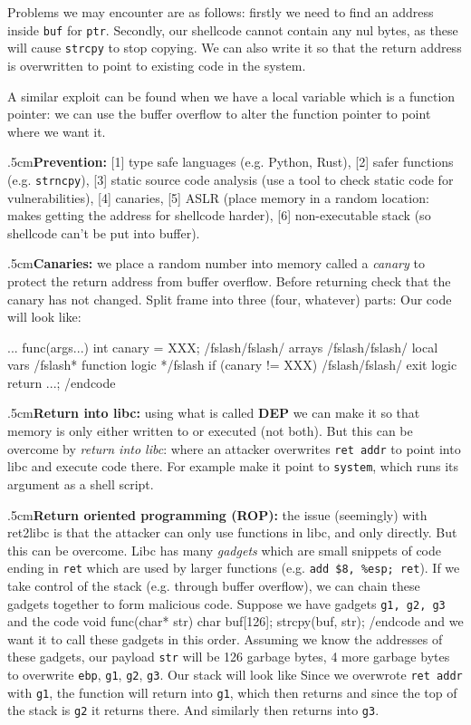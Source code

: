 Problems we may encounter are as follows: firstly we need to find an address inside {\tt buf} for {\tt ptr}.
Secondly, our shellcode cannot contain any nul bytes, as these will cause {\tt strcpy} to stop copying.
We can also write it so that the return address is overwritten to point to existing code in the system.

A similar exploit can be found when we have a local variable which is a function pointer: we can use the buffer overflow to alter the function pointer to point where we want it.

\quitvmode\kern.5cm{\bf Prevention:} [1] type safe languages (e.g. Python, Rust), [2] safer functions (e.g. {\tt strncpy}), [3] static source code analysis (use a tool to check static code for
vulnerabilities), [4] canaries, [5] ASLR (place memory in a random location: makes getting the address for shellcode harder), [6] non-executable stack (so shellcode can't be put into buffer).

\quitvmode\kern.5cm{\bf Canaries:} we place a random number into memory called a {\it canary} to protect the return address from buffer overflow.
Before returning check that the canary has not changed.
Split frame into three (four, whatever) parts:
Our code will look like:

\begincode
... func(args...) {
    int canary = XXX;
    /fslash/fslash/ arrays
    /fslash/fslash/ local vars
    /fslash* function logic */fslash
    if (canary != XXX) /fslash/fslash/ exit logic
    return ...;
}
/endcode

\quitvmode\kern.5cm{\bf Return into libc:} using what is called {\bf DEP} we can make it so that memory is only either written to or executed (not both).
But this can be overcome by {\it return into libc}: where an attacker overwrites {\tt ret addr} to point into libc and execute code there.
For example make it point to {\tt system}, which runs its argument as a shell script.

\quitvmode\kern.5cm{\bf Return oriented programming (ROP):} the issue (seemingly) with ret2libc is that the attacker can only use functions in libc, and only directly.
But this can be overcome.
Libc has many {\it gadgets} which are small snippets of code ending in {\tt ret} which are used by larger functions (e.g. {\tt add \$8, \%esp; ret}).
If we take control of the stack (e.g. through buffer overflow), we can chain these gadgets together to form malicious code.
Suppose we have gadgets {\tt g1, g2, g3} and the code
\begincode
void func(char* str) {
    char buf[126];
    strcpy(buf, str);
}
/endcode
and we want it to call these gadgets in this order.
Assuming we know the addresses of these gadgets, our payload {\tt str} will be 126 garbage bytes, 4 more garbage bytes to overwrite {\tt ebp}, {\tt g1}, {\tt g2}, {\tt g3}.
Our stack will look like
Since we overwrote {\tt ret addr} with {\tt g1}, the function will return into {\tt g1}, which then returns and since the top of the stack is {\tt g2} it returns there.
And similarly then returns into {\tt g3}.

